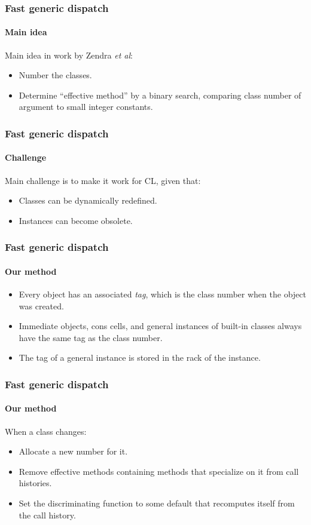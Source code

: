 \documentclass{beamer}
\begin{document}
\begin{frame}
  \frametitle{Fast generic dispatch}
  \framesubtitle{Main idea}

  Main idea in work by Zendra \emph{et al}:

  \begin{itemize}
  \item Number the classes.
  \item Determine ``effective method'' by a binary search, comparing
    class number of argument to small integer constants.
  \end{itemize}

\end{frame}
\begin{frame}
  \frametitle{Fast generic dispatch}
  \framesubtitle{Challenge}

  Main challenge is to make it work for CL, given that:

  \begin{itemize}
  \item Classes can be dynamically redefined.
  \item Instances can become obsolete.
  \end{itemize}

\end{frame}
\begin{frame}
  \frametitle{Fast generic dispatch}
  \framesubtitle{Our method}

  \begin{itemize}
  \item Every object has an associated \emph{tag}, which is the class
    number when the object was created.
  \item Immediate objects, cons cells, and general instances of
    built-in classes always have the same tag as the class number.
  \item The tag of a general instance is stored in the rack of the
    instance. 
  \end{itemize}

\end{frame}
\begin{frame}
  \frametitle{Fast generic dispatch}
  \framesubtitle{Our method}

  When a class changes:

  \begin{itemize}
  \item Allocate a new number for it.
  \item Remove effective methods containing methods that specialize on
    it from call histories.
  \item Set the discriminating function to some default that
    recomputes itself from the call history.
  \end{itemize}

\end{frame}
\end{document}
